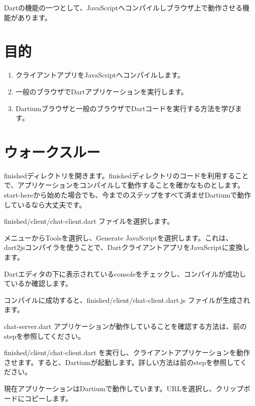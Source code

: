 
Dartの機能の一つとして、JavaScriptへコンパイルしブラウザ上で動作させる機能があります。

\section{目的}

\begin{enumerate}
\item クライアントアプリをJavaScriptへコンパイルします。
\item 一般のブラウザでDartアプリケーションを実行します。
\item Dartiumブラウザと一般のブラウザでDartコードを実行する方法を学びます。
\end{enumerate}

\section{ウォークスルー}

finishedディレクトリを開きます。finishedディレクトリのコードを利用することで、アプリケーションをコンパイルして動作することを確かなものとします。start-hereから始めた場合でも、今までのステップをすべて済ませDartiumで動作しているなら大丈夫です。

finished/client/chat-client.dart ファイルを選択します。


メニューからToolsを選択し、Generate JavaScriptを選択します。これは、dart2jsコンパイラを使うことで、DartクライアントアプリをJavaScriptに変換します。


Dartエディタの下に表示されているconsoleをチェックし、コンパイルが成功しているか確認します。


コンパイルに成功すると、finished/client/chat-client.dart.js ファイルが生成されます。


chat-server.dart アプリケーションが動作していることを確認する方法は、前のstepを参照してください。

finished/client/chat-client.dart を実行し、クライアントアプリケーションを動作させます。すると、Dartiumが起動します。詳しい方法は前のstepを参照してください。

現在アプリケーションはDartiumで動作しています。URLを選択し、クリップボードにコピーします。

